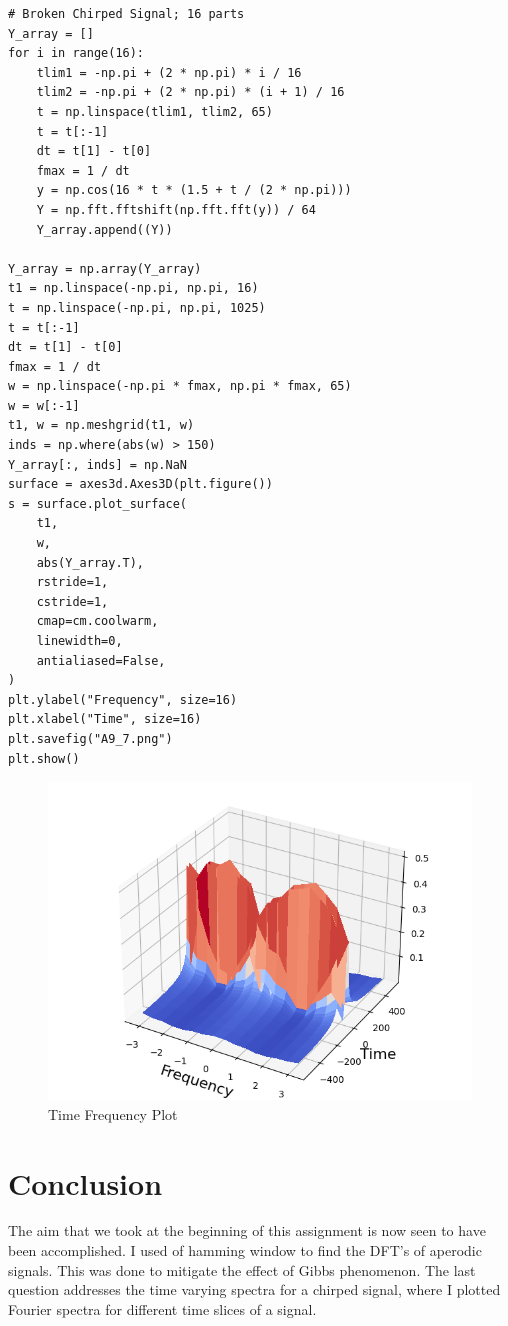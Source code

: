 \documentclass[11pt, a4paper]{article}
\begin{document}
\begin{verbatim}
# Broken Chirped Signal; 16 parts
Y_array = []
for i in range(16):
    tlim1 = -np.pi + (2 * np.pi) * i / 16
    tlim2 = -np.pi + (2 * np.pi) * (i + 1) / 16
    t = np.linspace(tlim1, tlim2, 65)
    t = t[:-1]
    dt = t[1] - t[0]
    fmax = 1 / dt
    y = np.cos(16 * t * (1.5 + t / (2 * np.pi)))
    Y = np.fft.fftshift(np.fft.fft(y)) / 64
    Y_array.append((Y))

Y_array = np.array(Y_array)
t1 = np.linspace(-np.pi, np.pi, 16)
t = np.linspace(-np.pi, np.pi, 1025)
t = t[:-1]
dt = t[1] - t[0]
fmax = 1 / dt
w = np.linspace(-np.pi * fmax, np.pi * fmax, 65)
w = w[:-1]
t1, w = np.meshgrid(t1, w)
inds = np.where(abs(w) > 150)
Y_array[:, inds] = np.NaN
surface = axes3d.Axes3D(plt.figure())
s = surface.plot_surface(
    t1,
    w,
    abs(Y_array.T),
    rstride=1,
    cstride=1,
    cmap=cm.coolwarm,
    linewidth=0,
    antialiased=False,
)
plt.ylabel("Frequency", size=16)
plt.xlabel("Time", size=16)
plt.savefig("A9_7.png")
plt.show()

\end{verbatim}

\begin{figure}[!tbh]
   	\centering
  \includegraphics[scale=0.5]{A9_7.png} 
    \caption{Time Frequency Plot} 	
   \end{figure}  


\section{Conclusion}
The aim that we took at the beginning of this assignment is now seen to have been accomplished. I used of hamming window to find the DFT’s of aperodic signals. This was done to mitigate the effect of Gibbs phenomenon. The last question addresses the time varying spectra for a chirped signal, where I plotted Fourier spectra for different time slices of a signal.
\end{document}
